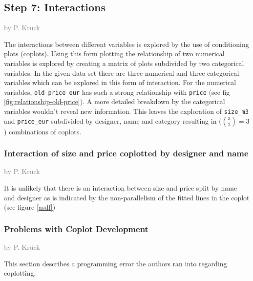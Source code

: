 \documentclass[a4paper, nobind]{templates/ociamthesis}
\begin{document}
\hypertarget{step-7-interactions}{%
\subsection{Step 7: Interactions}\label{step-7-interactions}}

\textcolor{gray}{by P. Krück}

The interactions between different variables is explored by the use of conditioning plots (coplots).
Using this form plotting the relationship of two numerical variables is explored by creating a matrix of plots subdivided by two categorical variables.
In the given data set there are three numerical and three categorical variables which can be explored in this form of interaction. For the numerical variables, \texttt{old\_price\_eur} has such a strong relationship with \texttt{price} (see fig \ref{fig:relationship-old-price}). A more detailed breakdown by the categorical variables wouldn't reveal new information. This leaves the exploration of \texttt{size\_m3} and \texttt{price\_eur} subdivided by designer, name and category resulting in (\({3 \choose 2} = 3\)) combinations of coplots.

\hypertarget{size-price-interaction}{%
\subsubsection{Interaction of size and price coplotted by designer and name}\label{size-price-interaction}}

\textcolor{gray}{by P. Krück}

It is unlikely that there is an interaction between size and price split by name and designer as is indicated by the non-parallelism of the fitted lines in the coplot (see figure \ref{asdf})

\hypertarget{problems-with-coplot-development}{%
\subsubsection{Problems with Coplot Development}\label{problems-with-coplot-development}}

\textcolor{gray}{by P. Krück}

This section describes a programming error the authors ran into regarding coplotting.
\end{document}
